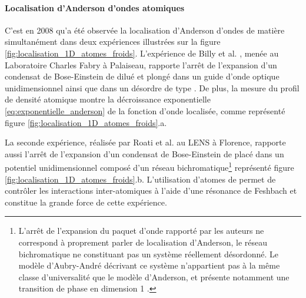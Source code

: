 \paragraph*{Localisation d'Anderson d'ondes atomiques}
C'est en 2008 qu'a été observée la localisation d'Anderson d'ondes de matière simultanément dans deux expériences illustrées sur la figure \ref{fig:localisation_1D_atomes_froids}. L'expérience de Billy et al. \citep{billy2008direct}, menée au Laboratoire Charles Fabry à Palaiseau, rapporte l'arrêt de l'expansion d'un condensat de Bose-Einstein de  dilué et plongé dans un guide d'onde optique unidimensionnel ainsi que dans un désordre de type \speckle . De plus, la mesure du profil de densité atomique montre la décroissance exponentielle \ref{eq:exponentielle_anderson} de la fonction d'onde localisée, comme représenté figure \ref{fig:localisation_1D_atomes_froids}.a. 

La seconde expérience, réalisée par Roati et al. \citep{roati2008anderson} au LENS à Florence, rapporte aussi l'arrêt de l'expansion d'un condensat de Bose-Einstein de  placé dans un potentiel unidimensionnel composé d'un réseau bichromatique\footnote{L'arrêt de l'expansion du paquet d'onde rapporté par les auteurs ne correspond à proprement parler de localisation d'Anderson, le réseau bichromatique ne constituant pas un système réellement désordonné. Le modèle d'Aubry-André décrivant ce système n'appartient pas à la même classe d'universalité que le modèle d'Anderson, et présente notamment une transition de phase en dimension 1 \citep{sarma1988mobility}.} représenté figure \ref{fig:localisation_1D_atomes_froids}.b. L'utilisation d'atomes de  permet de contrôler les interactions inter-atomiques à l'aide d'une résonance de Feshbach et constitue la grande force de cette expérience.

